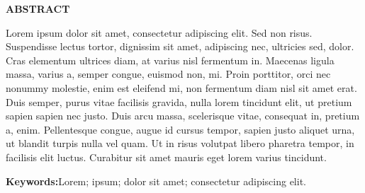 \begin{center}
    \textbf{\normalsize ABSTRACT}
\end{center}

\vspace{1cm}

\noindent %
\begin{justify} %
Lorem ipsum dolor sit amet, consectetur adipiscing elit. Sed non risus. Suspendisse lectus tortor, dignissim sit amet, adipiscing nec, ultricies sed, dolor. Cras elementum ultrices diam, at varius nisl fermentum in. Maecenas ligula massa, varius a, semper congue, euismod non, mi. Proin porttitor, orci nec nonummy molestie, enim est eleifend mi, non fermentum diam nisl sit amet erat. Duis semper, purus vitae facilisis gravida, nulla lorem tincidunt elit, ut pretium sapien sapien nec justo. Duis arcu massa, scelerisque vitae, consequat in, pretium a, enim. Pellentesque congue, augue id cursus tempor, sapien justo aliquet urna, ut blandit turpis nulla vel quam. Ut in risus volutpat libero pharetra tempor, in facilisis elit luctus. Curabitur sit amet mauris eget lorem varius tincidunt.
\end{justify}

\vspace{1.5cm}

\noindent \textbf{Keywords:}Lorem; ipsum; dolor sit amet; consectetur adipiscing elit.

\thispagestyle{empty}